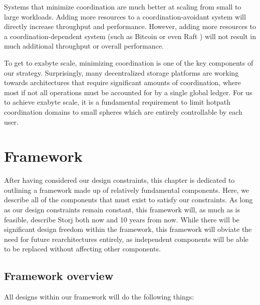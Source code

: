 \documentclass[8pt,fleqn,openany]{book}
\begin{document}
Systems that minimize coordination are
much better at scaling from small
to large workloads. Adding more resources to a coordination-avoidant system
will directly increase throughput and performance. However,
adding more resources to a coordination-dependent system
(such as Bitcoin \cite{bitcoin} or even Raft \cite{raft}) will not result in
much additional throughput or overall performance.

To get to exabyte scale, minimizing coordination is one of the key components
of our strategy.
Surprisingly, many decentralized storage platforms are working towards
architectures that require significant amounts of coordination,
where most if not all operations must be accounted for by a single global
ledger. For us to achieve exabyte scale, it is a fundamental requirement to
limit hotpath coordination domains to small spheres which are entirely
controllable by each user.

\chapter{Framework}\label{chap:framework}

After having considered our design constraints, this chapter is dedicated
to outlining a framework made up of relatively fundamental components.
Here, we describe
all of the components that must exist to satisfy our constraints.
As long as our design constraints remain constant, this framework will, as
much as is feasible, describe Storj both now and 10 years from now.
While there will be significant design freedom within the framework,
this framework will obviate the need for future rearchitectures entirely, as
independent components will be able to be replaced without affecting other
components.

\section{Framework overview}

All designs within our framework will do the following things:
\end{document}
